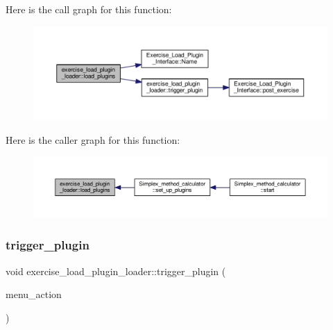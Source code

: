 Here is the call graph for this function\+:\nopagebreak
\begin{figure}[H]
\begin{center}
\leavevmode
\includegraphics[width=350pt]{classexercise__load__plugin__loader_a1a388b6c581a2fb5870f16913181284e_cgraph}
\end{center}
\end{figure}
Here is the caller graph for this function\+:\nopagebreak
\begin{figure}[H]
\begin{center}
\leavevmode
\includegraphics[width=350pt]{classexercise__load__plugin__loader_a1a388b6c581a2fb5870f16913181284e_icgraph}
\end{center}
\end{figure}
\mbox{\label{classexercise__load__plugin__loader_a43ae5461bec5ad5a7afdb25a4ae2b021}} 
\subsubsection{\texorpdfstring{trigger\+\_\+plugin}{trigger\_plugin}}
{\footnotesize\ttfamily void exercise\+\_\+load\+\_\+plugin\+\_\+loader\+::trigger\+\_\+plugin (\begin{DoxyParamCaption}\item[{Q\+Action $\ast$}]{menu\+\_\+action }\end{DoxyParamCaption})\hspace{0.3cm}{\ttfamily [slot]}}



